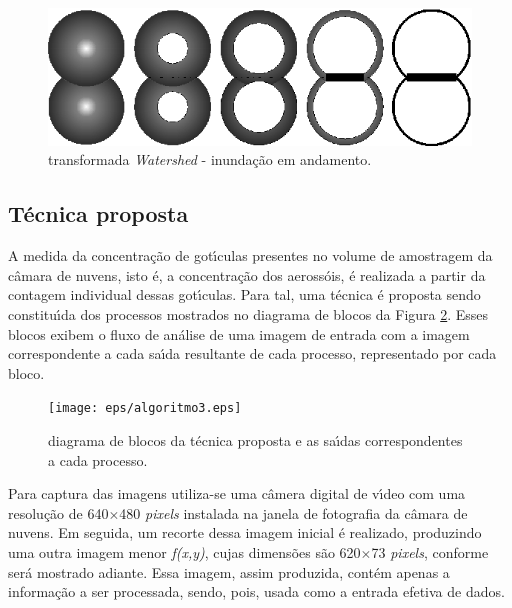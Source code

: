 \begin{figure}[hbt]
\begin{center}
\includegraphics[scale=0.7]{eps/watershed_final9.eps}
\end{center}
\caption{\label{watershed}\hspace{-0.1em} transformada \textit{Watershed} - inunda\c{c}\~{a}o em andamento.}
\end{figure}





\subsection{T\'{e}cnica proposta}

A medida da concentra\c{c}\~{a}o de got\'{\i}culas presentes no volume de amostragem da c\^{a}mara de nuvens, isto \'{e}, a concentra\c{c}\~{a}o dos aeross\'{o}is, \'{e} realizada a partir da contagem individual dessas got\'{\i}culas. Para tal, uma t\'{e}cnica \'{e} proposta sendo constitu\'{\i}da dos processos mostrados no diagrama de blocos da Figura \ref{algoritmo}. Esses blocos exibem o fluxo de an\'{a}lise de uma imagem de entrada com a imagem correspondente a cada sa\'{\i}da resultante de cada processo, representado por cada bloco.

\begin{figure}[hbt]
\begin{center}
\texttt{[image: eps/algoritmo3.eps]}\\
\end{center}
\caption{\label{algoritmo}\hspace{-0.1em} diagrama de blocos da t\'{e}cnica proposta e as sa\'{\i}das correspondentes a cada processo.}
\end{figure}

Para captura das imagens utiliza-se uma c\^{a}mera digital de v\'{\i}deo com uma resolu\c{c}\~{a}o de 640$\times$480 \textit{pixels} instalada na janela de fotografia da c\^{a}mara de nuvens. Em seguida, um recorte dessa imagem inicial \'{e} realizado, produzindo uma outra imagem menor \emph{f(x,y)}, cujas dimens\~{o}es s\~{a}o 620$\times$73 \emph{pixels}, conforme ser\'{a} mostrado adiante. Essa  imagem, assim produzida, cont\'{e}m apenas a informa\c{c}\~{a}o a ser processada, sendo, pois, usada como a entrada efetiva de dados.


